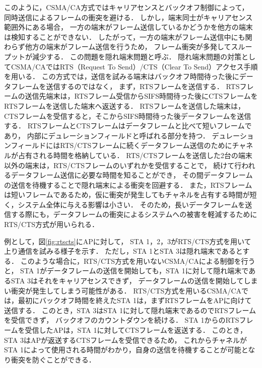 \documentclass[master]{kuisthesis}		%
\begin{document}
			\par
			このように，CSMA/CA方式ではキャリアセンスとバックオフ制御によって，
			同時送信によるフレームの衝突を避ける．
			しかし，端末同士がキャリアセンス範囲外にある場合，
			一方の端末がフレーム送信しているかどうかを他方の端末は検知することができない．
			したがって，一方の端末がフレーム送信中にも関わらず他方の端末がフレーム送信を行うため，
			フレーム衝突が多発してスループットが減少する．
			この問題を隠れ端末問題と呼ぶ．
			隠れ端末問題の対策としてCSMA/CAではRTS（Request To Send）/CTS（Clear To Send）アクセス手順を用いる．
			この方式では，送信を試みる端末はバックオフ時間待った後にデータフレームを送信するのではなく，
			まず，RTSフレームを送信する．
			RTSフレームの送信先端末は，RTSフレーム受信からSIFS時間待った後にCTSフレームをRTSフレームを送信した端末へ返送する．
			RTSフレームを送信した端末は，CTSフレームを受信すると，そこからSIFS時間待った後データフレームを送信する．
			RTSフレームとCTSフレームはデータフレームと比べて短いフレームであり，
			内部にデュレーションフィールドと呼ばれる部分を持つ．
			デュレーションフィールドにはRTS/CTSフレームに続くデータフレーム送信のためにチャネルが占有される時間を格納している．
			RTS/CTSフレームを送信した2台の端末以外の端末は，RTS/CTSフレームのいずれかを受信することで，
			続けて行われるデータフレーム送信に必要な時間を知ることができ，
			その間データフレームの送信を待機することで隠れ端末による衝突を回避する．
			また，RTSフレームは短いフレームであるため，仮に衝突が発生してもチャネルを占有する時間が短く，システム全体に与える影響は小さい．
			そのため，長いデータフレームを送信する際にも，データフレームの衝突によるシステムへの被害を軽減するためにRTS/CTS方式が用いられる．


			\par
			例として，図\ref{fig:rtscts}にAPに対して，
			STA 1，2，3がRTS/CTS方式を用いて上り通信を試みる様子を示す．
			ただし，STA 1とSTA 3は隠れ端末であるとする．
			このような場合に，RTS/CTS方式を用いないCSMA/CAによる制御を行うと，
			STA 1がデータフレームの送信を開始しても，STA 1に対して隠れ端末であるSTA 3はそれをキャリアセンスできず，
			データフレームの送信を開始してしまい衝突が発生してしまう可能性がある．
			RTS/CTS方式を用いるCSMA/CAでは，最初にバックオフ時間を終えたSTA 1は，まずRTSフレームをAPに向けて送信する．
			このとき，STA 3はSTA 1に対して隠れ端末であるのでRTSフレームを受信できず，
			バックオフのカウントダウンを続ける．
			STA 1からのRTSフレームを受信したAPは，STA 1に対してCTSフレームを返送する．
			このとき，STA 3はAPが返送するCTSフレームを受信できるため，
			これからチャネルがSTA 1によって使用される時間がわかり，自身の送信を待機することが可能となり衝突を防ぐことができる．
\end{document}
